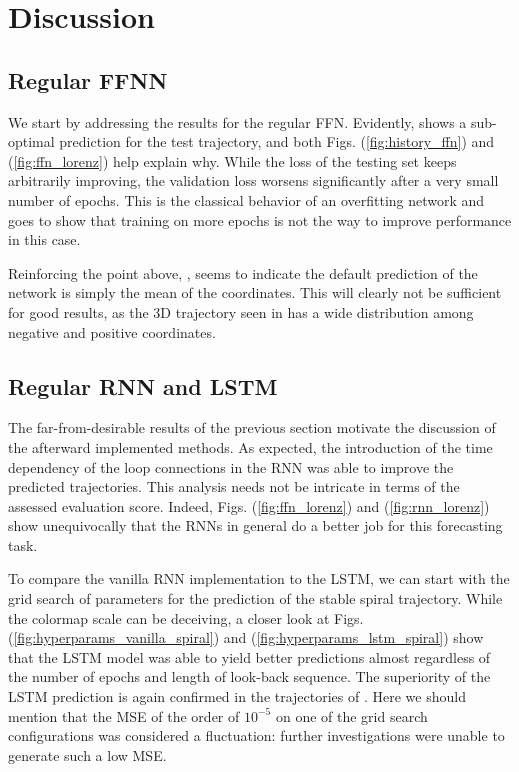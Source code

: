 \section{Discussion}\label{discussion}

\subsection{Regular FFNN}

We start by addressing the results for the regular FFN.  Evidently,  shows a sub-optimal prediction for the test trajectory, and both Figs. (\ref{fig:history_ffn}) and (\ref{fig:ffn_lorenz}) help explain why. While the loss of the testing set keeps arbitrarily improving, the validation loss worsens significantly after a very small number of epochs. This is the classical behavior of an overfitting network and goes to show that training on more epochs is not the way to improve performance in this case.

Reinforcing the point above, , seems to indicate the default prediction of the network is simply the mean of the coordinates. This will clearly not be sufficient for good results, as the 3D trajectory seen in  has a wide distribution among negative and positive coordinates. 

\subsection{Regular RNN and LSTM}

The far-from-desirable results of the previous section motivate the discussion of the afterward implemented methods. As expected, the introduction of the time dependency of the loop connections in the RNN was able to improve the predicted trajectories. This analysis needs not be intricate in terms of the assessed evaluation score. Indeed, Figs. (\ref{fig:ffn_lorenz}) and (\ref{fig:rnn_lorenz}) show unequivocally that the RNNs in general do a better job for this forecasting task.

To compare the vanilla RNN implementation to the LSTM, we can start with the grid search of parameters for the prediction of the stable spiral trajectory. While the colormap scale can be deceiving, a closer look at Figs. (\ref{fig:hyperparams_vanilla_spiral}) and (\ref{fig:hyperparams_lstm_spiral}) show that the LSTM model was able to yield better predictions almost regardless of the number of epochs and length of look-back sequence. The superiority of the LSTM prediction is again confirmed in the trajectories of . Here we should mention that the MSE of the order of $10^{-5}$ on one of the grid search configurations was considered a fluctuation: further investigations were unable to generate such a low MSE.

